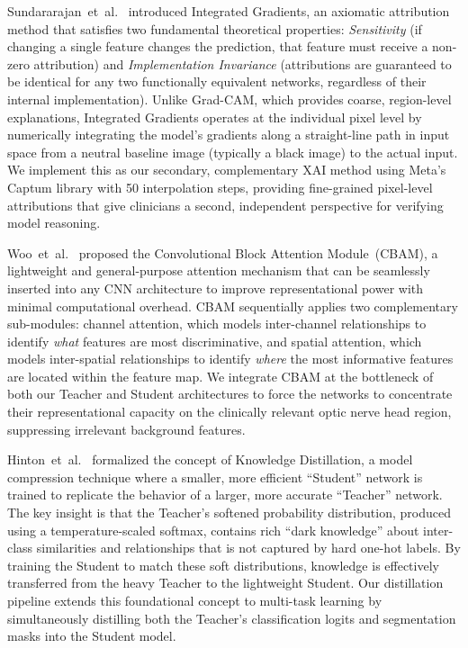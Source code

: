\documentclass[conference]{IEEEtran}
\begin{document}
Sundararajan~et~al.~\cite{sundararajan2017} introduced Integrated Gradients, an axiomatic attribution method that satisfies two fundamental theoretical properties: \textit{Sensitivity} (if changing a single feature changes the prediction, that feature must receive a non-zero attribution) and \textit{Implementation Invariance} (attributions are guaranteed to be identical for any two functionally equivalent networks, regardless of their internal implementation). Unlike Grad-CAM, which provides coarse, region-level explanations, Integrated Gradients operates at the individual pixel level by numerically integrating the model's gradients along a straight-line path in input space from a neutral baseline image (typically a black image) to the actual input. We implement this as our secondary, complementary XAI method using Meta's Captum library with 50 interpolation steps, providing fine-grained pixel-level attributions that give clinicians a second, independent perspective for verifying model reasoning.

Woo~et~al.~\cite{woo2018} proposed the Convolutional Block Attention Module~(CBAM), a lightweight and general-purpose attention mechanism that can be seamlessly inserted into any CNN architecture to improve representational power with minimal computational overhead. CBAM sequentially applies two complementary sub-modules: channel attention, which models inter-channel relationships to identify \textit{what} features are most discriminative, and spatial attention, which models inter-spatial relationships to identify \textit{where} the most informative features are located within the feature map. We integrate CBAM at the bottleneck of both our Teacher and Student architectures to force the networks to concentrate their representational capacity on the clinically relevant optic nerve head region, suppressing irrelevant background features.

Hinton~et~al.~\cite{hinton2015} formalized the concept of Knowledge Distillation, a model compression technique where a smaller, more efficient ``Student'' network is trained to replicate the behavior of a larger, more accurate ``Teacher'' network. The key insight is that the Teacher's softened probability distribution, produced using a temperature-scaled softmax, contains rich ``dark knowledge'' about inter-class similarities and relationships that is not captured by hard one-hot labels. By training the Student to match these soft distributions, knowledge is effectively transferred from the heavy Teacher to the lightweight Student. Our distillation pipeline extends this foundational concept to multi-task learning by simultaneously distilling both the Teacher's classification logits and segmentation masks into the Student model.
\end{document}
